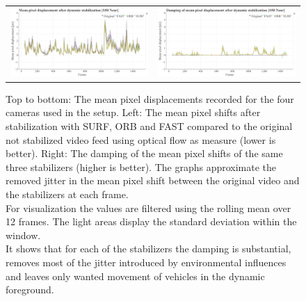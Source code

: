 \begin{figure}[!ht]
\begin{tabular}{cc}
      \includegraphics[width=0.475\linewidth]{diagrams/optical_flow/s50_s_near_image_raw.mp4.csv/compare_of_mean_pixel_displacement/window_size_12.html.png}    &   
      \includegraphics[width=0.475\linewidth]{diagrams/optical_flow/s50_s_near_image_raw.mp4.csv/deltas_of_mean_pixel_displacement/window_size_12.html.png}   \\ 
    \end{tabular}
    \caption{
        Top to bottom: The mean pixel displacements recorded for the four cameras used in the setup.
        Left: 
        The mean pixel shifts after stabilization with SURF, ORB and FAST compared to the original not stabilized video feed using optical flow as measure (lower is better).
        Right: 
        The damping of the mean pixel shifts of the same three stabilizers (higher is better). 
        The graphs approximate the removed jitter in the mean pixel shift between the original video and the stabilizers at each frame.\\
        For visualization the values are filtered using the rolling mean over 12 frames. 
        The light areas display the standard deviation within the window. \\
        It shows that for each of the stabilizers the damping is substantial, removes most of the jitter introduced by environmental influences and leaves only wanted movement of vehicles in the dynamic foreground.
    }
    \label{fig:dynamic_stabilization_appendix}
    \end{figure}

    


